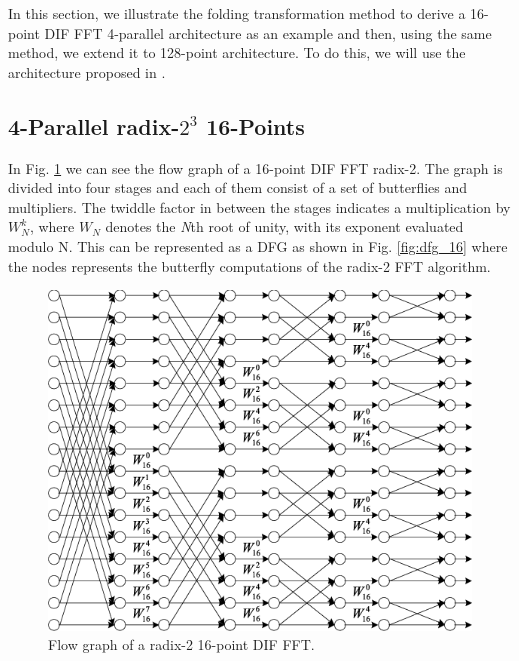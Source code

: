 \documentclass[journal,comsoc]{IEEEtran}
\begin{document}
In this section, we illustrate the folding transformation method to derive a 16-point DIF FFT 4-parallel architecture as an example and then, using the same method, we extend it to 128-point architecture. To do this, we will use the architecture proposed in \cite{ayinala_pipelined_2012}.
\subsection{4-Parallel radix-$2^3$ 16-Points}
In Fig. \ref{fig:flowgraph_16}  we can see the flow graph of a 16-point DIF FFT radix-2. The graph is divided into four stages and each of them consist of a set of butterflies and multipliers. The twiddle factor in between the stages indicates a multiplication by $W^k_N$, where $W_N$ denotes the \textit{N}th root of unity, with its exponent evaluated modulo N. This can be represented as a DFG as shown in Fig. \ref{fig:dfg_16} where the nodes represents the butterfly computations of the radix-2 FFT algorithm. 

\begin{figure}[htbp]
\centering
\includegraphics[width=\linewidth]{Diagramas/fft16.png}%
\caption{Flow graph of a radix-2 16-point DIF FFT.}
\label{fig:flowgraph_16}
\end{figure}
\end{document}

